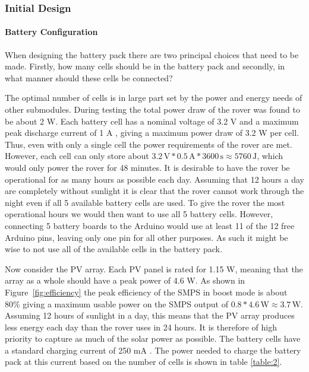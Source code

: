 \documentclass[a4paper]{article}
\newcommand{\unit}[1]{\ensuremath{\, \mathrm{#1}}}
\begin{document}
\subsubsection{Initial Design}

\paragraph*{Battery Configuration}
When designing the battery pack there are two principal choices that need to be 
made. Firstly, how many cells should be in the battery pack and secondly, in 
what manner should these cells be connected? 

The optimal number of cells is in large part set by the power and energy 
needs of other submodules. During testing the total power draw of the 
rover was found to be about 2 W. Each battery cell has a nominal voltage 
of 3.2 V and a maximum peak discharge current of 1 A \cite{batteryDatasheet}, 
giving a maximum power draw of 3.2 W per cell. Thus, even with only a 
single cell the power requirements of the rover are met. However, each 
cell can only store about 
\(3.2 \unit{V} * 0.5 \unit{A} * 3600 \unit{s} \approx 5760 \unit{J} \),  
which would only power the rover for 48 minutes. It is desirable to 
have the rover be operational for as many hours as possible each day. 
Assuming that 12 hours a day are completely without sunlight it is 
clear that the rover cannot work through the night even if all 
5 available battery cells are used. To give the rover the most 
operational hours we would then want to use all 5 battery cells. 
However, connecting 5 battery boards to the Arduino would use at 
least 11 of the 12 free Arduino pins, leaving only one pin for 
all other purposes. As such it might be wise to not use all of the 
available cells in the battery pack.

Now consider the PV array. Each PV panel is rated for 1.15 W, meaning that 
the array as a whole should have a peak power of 4.6 W. As shown in 
Figure~\ref{fig:efficiency} the peak efficiency of the SMPS in boost mode 
is about 80\% giving a maximum usable power on the SMPS output of 
\(0.8 * 4.6 \unit{W} \approx 3.7 \unit{W} \). Assuming 12 hours of 
sunlight in a day, this means that the PV array produces less energy 
each day than the rover uses in 24 hours. It is therefore of high 
priority to capture as much of the solar power as possible. The 
battery cells have a standard charging current of  250 mA 
\cite{batteryDatasheet}. The power needed to charge the battery 
pack at this current based on the number of cells is shown in 
table \ref{table:2}. 
\end{document}
